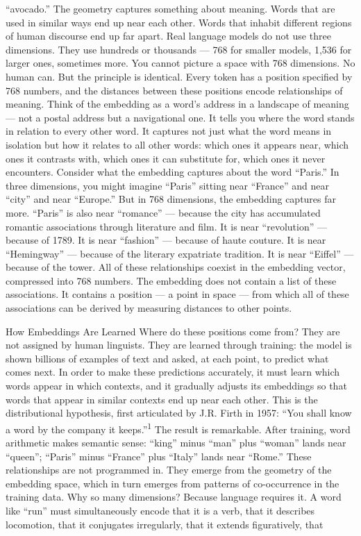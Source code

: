 “avocado.” The geometry captures something about meaning. Words that are used in similar ways end up near each other. Words that inhabit different regions of human discourse end up far apart. Real language models do not use three dimensions. They use hundreds or thousands — 768 for smaller models, 1,536 for larger ones, sometimes more. You cannot picture a space with 768 dimensions. No human can. But the principle is identical. Every token has a position specified by 768 numbers, and the distances between these positions encode relationships of meaning. Think of the embedding as a word’s address in a landscape of meaning — not a postal address but a navigational one. It tells you where the word stands in relation to every other word. It captures not just what the word means in isolation but how it relates to all other words: which ones it appears near, which ones it contrasts with, which ones it can substitute for, which ones it never encounters. Consider what the embedding captures about the word “Paris.” In three dimensions, you might imagine “Paris” sitting near “France” and near “city” and near “Europe.” But in 768 dimensions, the embedding captures far more. “Paris” is also near “romance” — because the city has accumulated romantic associations through literature and film. It is near “revolution” — because of 1789. It is near “fashion” — because of haute couture. It is near “Hemingway” — because of the literary expatriate tradition. It is near “Eiffel” — because of the tower. All of these relationships coexist in the embedding vector, compressed into 768 numbers. The embedding does not contain a list of these associations. It contains a position — a point in space — from which all of these associations can be derived by measuring distances to other points.

How Embeddings Are Learned Where do these positions come from? They are not assigned by human linguists. They are learned through training: the model is shown billions of examples of text and asked, at each point, to predict what comes next. In order to make these predictions accurately, it must learn which words appear in which contexts, and it gradually adjusts its embeddings so that words that appear in similar contexts end up near each other. This is the distributional hypothesis, first articulated by J.R. Firth in 1957: “You shall know a word by the company it keeps.”\textsuperscript{1} The result is remarkable. After training, word arithmetic makes semantic sense: “king” minus “man” plus “woman” lands near “queen”; “Paris” minus “France” plus “Italy” lands near “Rome.” These relationships are not programmed in. They emerge from the geometry of the embedding space, which in turn emerges from patterns of co-occurrence in the training data. Why so many dimensions? Because language requires it. A word like “run” must simultaneously encode that it is a verb, that it describes locomotion, that it conjugates irregularly, that it extends figuratively, that

